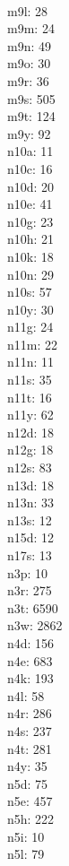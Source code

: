 \begin{multicols}{8}
  \\ m9l: 28
  \\ m9m: 24
  \\ m9n: 49
  \\ m9o: 30
  \\ m9r: 36
  \\ m9s: 505
  \\ m9t: 124
  \\ m9y: 92
  \\ n10a: 11
  \\ n10c: 16
  \\ n10d: 20
  \\ n10e: 41
  \\ n10g: 23
  \\ n10h: 21
  \\ n10k: 18
  \\ n10n: 29
  \\ n10s: 57
  \\ n10y: 30
  \\ n11g: 24
  \\ n11m: 22
  \\ n11n: 11
  \\ n11s: 35
  \\ n11t: 16
  \\ n11y: 62
  \\ n12d: 18
  \\ n12g: 18
  \\ n12s: 83
  \\ n13d: 18
  \\ n13n: 33
  \\ n13s: 12
  \\ n15d: 12
  \\ n17s: 13
  \\ n3p: 10
  \\ n3r: 275
  \\ n3t: 6590
  \\ n3w: 2862
  \\ n4d: 156
  \\ n4e: 683
  \\ n4k: 193
  \\ n4l: 58
  \\ n4r: 286
  \\ n4s: 237
  \\ n4t: 281
  \\ n4y: 35
  \\ n5d: 75
  \\ n5e: 457
  \\ n5h: 222
  \\ n5i: 10
  \\ n5l: 79

\end{multicols}
